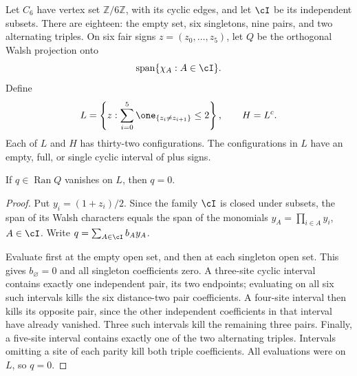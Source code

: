Let $C_6$ have vertex set $\mathbb Z/6\mathbb Z$, with its cyclic edges, and let $\cI$ be its independent subsets. There are eighteen: the empty set, six singletons, nine pairs, and two alternating triples. On six fair signs $z=(z_0,\ldots,z_5)$, let $Q$ be the orthogonal Walsh projection onto
\[
 \operatorname{span}\{\chi_A:A\in\cI\}.
\]
Define
\[
 L=\left\{z:\sum_{i=0}^5\one_{\{z_i\ne z_{i+1}\}}\le2\right\},
 \qquad H=L^c.
\]
Each of $L$ and $H$ has thirty-two configurations. The configurations in $L$ have an empty, full, or single cyclic interval of plus signs.

\begin{lemma}\label{lem:rank}
If $q\in\operatorname{Ran}Q$ vanishes on $L$, then $q=0$.
\end{lemma}
\begin{proof}
Put $y_i=(1+z_i)/2$. Since the family $\cI$ is closed under subsets, the span of its Walsh characters equals the span of the monomials $y_A=\prod_{i\in A}y_i$, $A\in\cI$. Write $q=\sum_{A\in\cI}b_Ay_A$.

Evaluate first at the empty open set, and then at each singleton open set. This gives $b_\varnothing=0$ and all singleton coefficients zero. A three-site cyclic interval contains exactly one independent pair, its two endpoints; evaluating on all six such intervals kills the six distance-two pair coefficients. A four-site interval then kills its opposite pair, since the other independent coefficients in that interval have already vanished. Three such intervals kill the remaining three pairs. Finally, a five-site interval contains exactly one of the two alternating triples. Intervals omitting a site of each parity kill both triple coefficients. All evaluations were on $L$, so $q=0$.
\end{proof}

